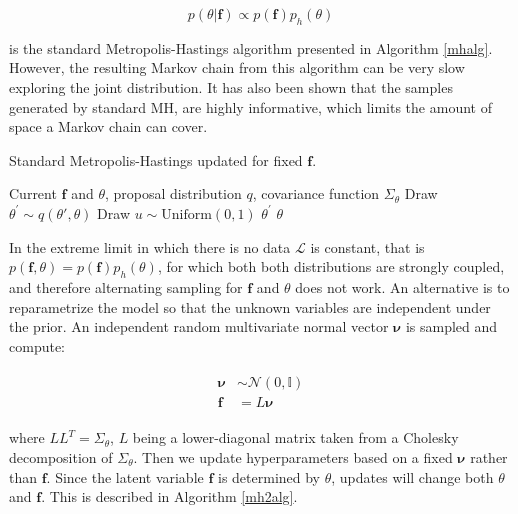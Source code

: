 \documentclass[10pt,a4paper,twoside]{book}
\begin{document}
\begin{equation}
p(\theta|\boldsymbol{f}) \propto p(\boldsymbol{f}) p_h(\theta)
\end{equation}

is the standard Metropolis-Hastings algorithm presented in Algorithm \ref{mhalg}. However, the resulting Markov chain from this algorithm can be very slow exploring the joint distribution. It has also been shown that the samples generated by standard MH, are highly informative, which limits the amount of space a Markov chain can cover.\\

\begin{algorithm}
	\caption{Standard Metropolis-Hastings updated for fixed $\boldsymbol{f}$.}
		\label{mhalg}
		\begin{algorithmic}[1]
		\Require Current $\boldsymbol{f}$ and $\theta$, proposal distribution $q$, covariance function $\Sigma_\theta$ 
		\State Draw $\theta^{'} \sim q(\theta{'}, \theta)$		
		\State Draw $u\sim \mathrm{Uniform}(0, 1)$
			\Return $\theta^{'}$
		\Else\;
			\Return $\theta$
		\EndIf
		\end{algorithmic}
\end{algorithm}

In the extreme limit in which there is no data $\mathcal{L}$ is constant, that is $p(\boldsymbol{f}, \theta) = p(\boldsymbol{f})p_h(\theta)$, for which both both distributions are strongly coupled, and therefore alternating sampling for $\boldsymbol{f}$ and $\theta$ does not work. An alternative is to reparametrize the model so that the unknown variables are independent under the prior. An independent random multivariate normal vector $\boldsymbol{\nu}$ is sampled and compute:

\begin{align}
\begin{split}
\boldsymbol{\nu} &\sim \mathcal{N}(0, \mathbb{I}) \\
\boldsymbol{f} &= L\boldsymbol{\nu}
\end{split}
\end{align}


where $LL^T = \Sigma_\theta$, $L$ being a lower-diagonal matrix taken from a Cholesky decomposition of $\Sigma_\theta$. Then we update hyperparameters based on a fixed $\boldsymbol{\nu}$ rather than $\boldsymbol{f}$. Since the latent variable $\boldsymbol{f}$ is determined by $\theta$, updates will change both $\theta$ and $\boldsymbol{f}$. This is described in Algorithm \ref{mh2alg}.
\end{document}
